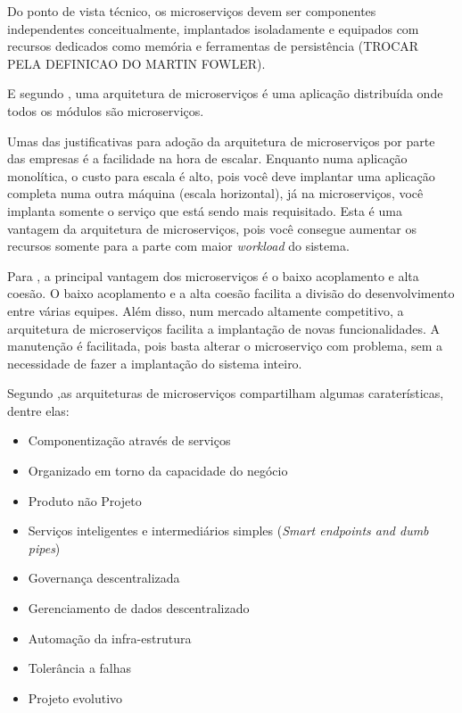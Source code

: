 \documentclass[12pt]{article}
\theoremstyle{plain}
\begin{document}
Do ponto de vista técnico, os microserviços devem ser componentes independentes conceitualmente, implantados isoladamente e equipados com recursos dedicados como memória e ferramentas de persistência \cite{Dragoni2017} (TROCAR PELA DEFINICAO DO MARTIN FOWLER).

E segundo \cite{Dragoni2017}, uma arquitetura de microserviços é uma aplicação distribuída onde todos os módulos são microserviços.

Umas das justificativas para adoção da arquitetura de microserviços por parte das empresas é a facilidade na hora de escalar. Enquanto numa aplicação monolítica, o custo para escala é alto, pois você deve implantar uma aplicação completa numa outra máquina (escala horizontal), já na microserviços, você implanta somente o serviço que está sendo mais requisitado. Esta é uma vantagem da arquitetura de microserviços, pois você consegue aumentar os recursos somente para a parte com maior \textit{workload} do sistema. 

Para \cite{wolf:2018}, a principal vantagem dos microserviços é o baixo acoplamento e alta coesão. O baixo acoplamento e a alta coesão facilita a divisão do desenvolvimento entre várias equipes. Além disso, num mercado altamente competitivo, a arquitetura de microserviços facilita a implantação de novas funcionalidades. A manutenção é facilitada, pois basta alterar o microserviço com problema, sem a necessidade de fazer a implantação do sistema inteiro.

Segundo \cite{martinfowler-microservices:2014},as arquiteturas de microserviços compartilham algumas caraterísticas, dentre elas:

\begin{itemize}
    \item Componentização através de serviços
    \item Organizado em torno da capacidade do negócio
    \item Produto não Projeto
    \item Serviços inteligentes e intermediários simples (\textit{Smart endpoints and dumb pipes})
    \item Governança descentralizada
    \item Gerenciamento de dados descentralizado
    \item Automação da infra-estrutura
    \item Tolerância a falhas
    \item Projeto evolutivo
\end{itemize}
\end{document}
